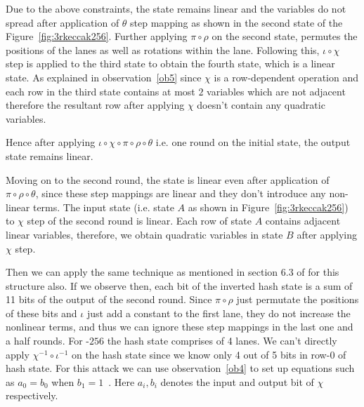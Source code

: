 Due to the above constraints, the state remains linear and the variables do not spread after application of $\theta$ step mapping as shown in the second state of the Figure~\ref{fig:3rkeccak256}. Further applying $\pi \circ \rho$ on the second state, permutes the positions of the lanes as well as rotations within the lane. Following this, $\iota \circ \chi$ step is applied to the third state to obtain the fourth state, which is a linear state. As explained in observation~\ref{ob5} since $\chi$ is a row-dependent operation and each row in the third state contains at most $2$ variables which are not adjacent therefore the resultant row after applying $\chi$ doesn't contain any quadratic variables.

Hence after applying $\iota \circ \chi \circ \pi \circ \rho \circ \theta $ i.e. one round on the initial state, the output state remains linear.

Moving on to the second round, the state is linear even after application of $\pi \circ \rho \circ \theta$, since these step mappings are linear and they don't introduce any non-linear terms. The input state (i.e. state $A$ as shown in Figure~\ref{fig:3rkeccak256}) to $\chi$ step of the second round is linear. Each row of state $A$ contains adjacent linear variables, therefore, we obtain quadratic variables in state $B$ after applying $\chi$ step.


Then we can apply the same technique as mentioned in section 6.3 of \cite{guo2016linear} for this structure also. If we observe then, each bit of the inverted hash state is a sum of 11 bits of the output of the second round. Since $\pi \circ \rho$ just permutate the positions of these bits and $\iota$ just add a constant to the first lane, they do not increase the nonlinear terms, and thus we can ignore these step mappings in the last one and a half rounds. For \Keccak-$256$ the hash state comprises of 4 lanes. We can't directly apply $\chi^{-1} \circ \iota^{-1}$ on the hash state since we know only 4 out of 5 bits in row-$0$ of hash state. For this attack we can use observation~\ref{ob4} to set up equations such as $a_0 = b_0$ when $b_1 = 1$~\cite{guo2016linear}. Here $a_i,b_i$ denotes the input and output bit of $\chi$ respectively. 

